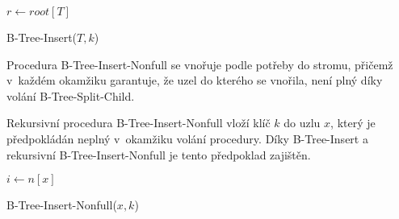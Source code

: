 \begin{algorithm}[t]
\SetAlgoLined
{}

$r\longleftarrow root[T]$

\caption{B-Tree-Insert($T,k$)}
\end{algorithm}

Procedura B-Tree-Insert-Nonfull se vnořuje podle potřeby do stromu, přičemž v~každém okamžiku garantuje, že uzel do kterého se vnořila, není plný díky volání B-Tree-Split-Child.

Rekursivní procedura B-Tree-Insert-Nonfull vloží klíč $k$ do uzlu $x$, který je předpokládán neplný v~okamžiku volání procedury.
Díky B-Tree-Insert a rekursivní B-Tree-Insert-Nonfull je tento předpoklad zajištěn.

\begin{algorithm}[t]
\SetAlgoLined
{}

$i \longleftarrow n[x]$\\

\caption{B-Tree-Insert-Nonfull($x,k$)}
\end{algorithm}

